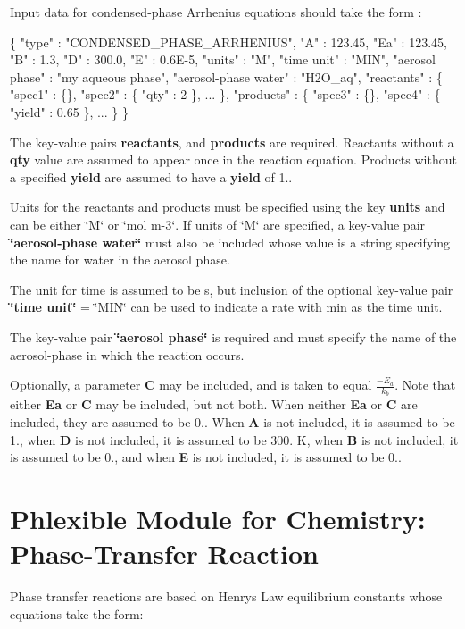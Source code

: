 Input data for condensed-\/phase Arrhenius equations should take the form \+: 
\begin{DoxyCode}
\{
  "type" : "CONDENSED\_PHASE\_ARRHENIUS",
  "A" : 123.45,
  "Ea" : 123.45,
  "B"  : 1.3,
  "D"  : 300.0,
  "E"  : 0.6E-5,
  "units" : "M",
  "time unit" : "MIN",
  "aerosol phase" : "my aqueous phase",
  "aerosol-phase water" : "H2O\_aq",
  "reactants" : \{
    "spec1" : \{\},
    "spec2" : \{ "qty" : 2 \},
    ...
  \},
  "products" : \{
    "spec3" : \{\},
    "spec4" : \{ "yield" : 0.65 \},
    ...
  \}
\}
\end{DoxyCode}
 The key-\/value pairs {\bfseries reactants}, and {\bfseries products} are required. Reactants without a {\bfseries qty} value are assumed to appear once in the reaction equation. Products without a specified {\bfseries yield} are assumed to have a {\bfseries yield} of 1..

Units for the reactants and products must be specified using the key {\bfseries units} and can be either \char`\"{}\+M\char`\"{} or \char`\"{}mol m-\/3\char`\"{}. If units of \char`\"{}\+M\char`\"{} are specified, a key-\/value pair {\bfseries \char`\"{}aerosol-\/phase water\char`\"{}} must also be included whose value is a string specifying the name for water in the aerosol phase.

The unit for time is assumed to be s, but inclusion of the optional key-\/value pair {\bfseries \char`\"{}time unit\char`\"{}} = \char`\"{}\+M\+I\+N\char`\"{} can be used to indicate a rate with min as the time unit.

The key-\/value pair {\bfseries \char`\"{}aerosol phase\char`\"{}} is required and must specify the name of the aerosol-\/phase in which the reaction occurs.

Optionally, a parameter {\bfseries C} may be included, and is taken to equal $\frac{-E_a}{k_b}$. Note that either {\bfseries Ea} or {\bfseries C} may be included, but not both. When neither {\bfseries Ea} or {\bfseries C} are included, they are assumed to be 0.. When {\bfseries A} is not included, it is assumed to be 1., when {\bfseries D} is not included, it is assumed to be 300. K, when {\bfseries B} is not included, it is assumed to be 0., and when {\bfseries E} is not included, it is assumed to be 0.. \hypertarget{phlex_rxn_HL_phase_transfer}{}\section{Phlexible Module for Chemistry\+: Phase-\/\+Transfer Reaction}\label{phlex_rxn_HL_phase_transfer}
Phase transfer reactions are based on Henry\textquotesingle{}s Law equilibrium constants whose equations take the form\+:


